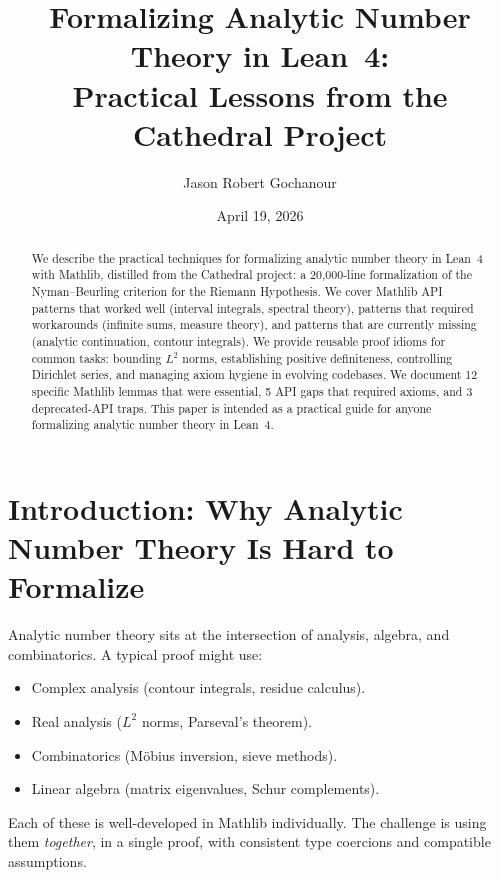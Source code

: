 \documentclass[11pt,a4paper]{article}
\title{%
  Formalizing Analytic Number Theory in Lean~4:\\
  Practical Lessons from the Cathedral Project%
}
\author{
  Jason Robert Gochanour
}
\date{April 19, 2026}
\begin{document}
\maketitle

\begin{abstract}
We describe the practical techniques for formalizing analytic number
theory in Lean~4 with Mathlib, distilled from the Cathedral project:
a 20,000-line formalization of the Nyman--Beurling criterion for the
Riemann Hypothesis. We cover Mathlib API patterns that worked well
(interval integrals, spectral theory), patterns that required
workarounds (infinite sums, measure theory), and patterns that are
currently missing (analytic continuation, contour integrals). We
provide reusable proof idioms for common tasks: bounding $L^2$ norms,
establishing positive definiteness, controlling Dirichlet series,
and managing axiom hygiene in evolving codebases. We document 12
specific Mathlib lemmas that were essential, 5 API gaps that required
axioms, and 3 deprecated-API traps. This paper is intended as a
practical guide for anyone formalizing analytic number theory in
Lean~4.
\end{abstract}

\tableofcontents

\section{Introduction: Why Analytic Number Theory Is Hard to Formalize}
\label{sec:intro}

Analytic number theory sits at the intersection of analysis, algebra,
and combinatorics. A typical proof might use:

\begin{itemize}
  \item Complex analysis (contour integrals, residue calculus).
  \item Real analysis ($L^2$ norms, Parseval's theorem).
  \item Combinatorics (M\"obius inversion, sieve methods).
  \item Linear algebra (matrix eigenvalues, Schur complements).
\end{itemize}

Each of these is well-developed in Mathlib individually. The challenge
is using them \emph{together}, in a single proof, with consistent
type coercions and compatible assumptions.
\end{document}
